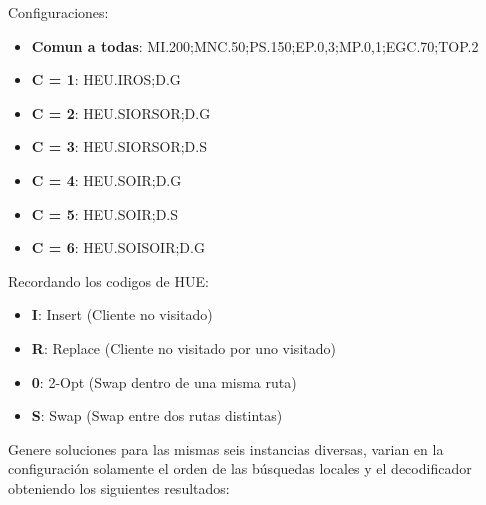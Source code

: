 \bigskip

Configuraciones: 
\begin{itemize}
  \item \textbf{Comun a todas}: MI.200;MNC.50;PS.150;EP.0,3;MP.0,1;EGC.70;TOP.2
  \item \textbf{C = 1}: HEU.IROS;D.G
  \item \textbf{C = 2}: HEU.SIORSOR;D.G
  \item \textbf{C = 3}: HEU.SIORSOR;D.S
  \item \textbf{C = 4}: HEU.SOIR;D.G
  \item \textbf{C = 5}: HEU.SOIR;D.S
  \item \textbf{C = 6}: HEU.SOISOIR;D.G
\end{itemize}

Recordando los codigos de HUE: 
\begin{itemize}
  \item \textbf{I}: Insert (Cliente no visitado)
  \item \textbf{R}: Replace (Cliente no visitado por uno visitado)
  \item \textbf{0}: 2-Opt (Swap dentro de una misma ruta)
  \item \textbf{S}: Swap (Swap entre dos rutas distintas)
\end{itemize}

\bigskip

Genere soluciones para las mismas seis instancias diversas, varian en la configuración solamente el orden de las búsquedas locales y el decodificador obteniendo los siguientes resultados:

\bigskip

